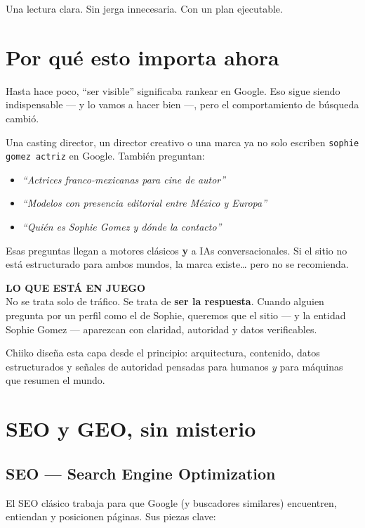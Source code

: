 \documentclass[11pt,a4paper]{article}
\newcommand{\callout}[2]{%
  \par\noindent
  \colorbox{soft}{%
    \begin{minipage}{\dimexpr\textwidth-1.1cm\relax}
      \vspace{0.45em}
      {\sffamily\bfseries\footnotesize\color{mute}#1}\\[0.4em]
      {\color{ink}#2}
      \vspace{0.45em}
    \end{minipage}%
  }%
  \par\vspace{0.85em}
}
\begin{document}
\vspace{0.4cm}
{\sffamily\small\color{mute}Una lectura clara. Sin jerga innecesaria. Con un plan ejecutable.}

\newpage
\setcounter{page}{2}

\section{Por qué esto importa ahora}

Hasta hace poco, ``ser visible'' significaba rankear en Google.
Eso sigue siendo indispensable --- y lo vamos a hacer bien ---,
pero el comportamiento de búsqueda cambió.

Una casting director, un director creativo o una marca ya no solo escriben
\texttt{sophie gomez actriz} en Google. También preguntan:

\begin{itemize}
  \item \emph{``Actrices franco-mexicanas para cine de autor''}
  \item \emph{``Modelos con presencia editorial entre México y Europa''}
  \item \emph{``Quién es Sophie Gomez y dónde la contacto''}
\end{itemize}

Esas preguntas llegan a motores clásicos \textbf{y} a IAs conversacionales.
Si el sitio no está estructurado para ambos mundos, la marca existe\ldots{} pero no se recomienda.

\callout{LO QUE ESTÁ EN JUEGO}{%
No se trata solo de tráfico. Se trata de \textbf{ser la respuesta}.
Cuando alguien pregunta por un perfil como el de Sophie, queremos que el sitio ---
y la entidad Sophie Gomez --- aparezcan con claridad, autoridad y datos verificables.
}

Chiiko diseña esta capa desde el principio: arquitectura, contenido, datos estructurados
y señales de autoridad pensadas para humanos \emph{y} para máquinas que resumen el mundo.

\section{SEO y GEO, sin misterio}

\subsection{SEO --- Search Engine Optimization}
El SEO clásico trabaja para que Google (y buscadores similares) encuentren, entiendan
y posicionen páginas. Sus piezas clave:
\end{document}

